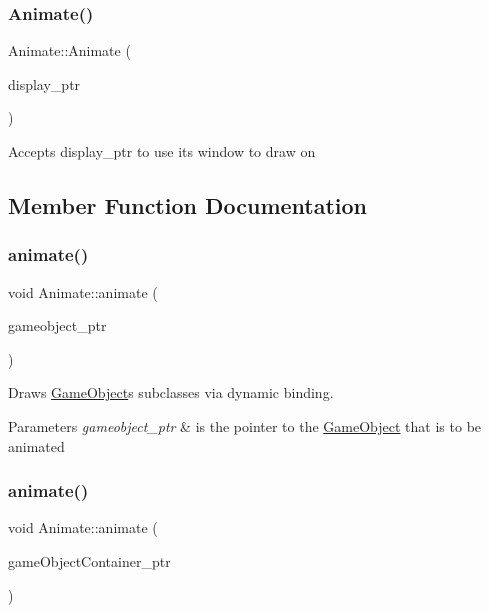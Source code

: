\subsubsection{\texorpdfstring{Animate()}{Animate()}}
{\footnotesize\ttfamily Animate\+::\+Animate (\begin{DoxyParamCaption}\item[{shared\+\_\+ptr$<$ \mbox{\hyperlink{class_display}{Display}} $>$}]{display\+\_\+ptr }\end{DoxyParamCaption})}

Accepts display\+\_\+ptr to use its window to draw on 

\subsection{Member Function Documentation}
\mbox{\label{class_animate_af57977742bd75111683827481af7ea2b}} 
\subsubsection{\texorpdfstring{animate()}{animate()}\hspace{0.1cm}{\footnotesize\ttfamily [1/2]}}
{\footnotesize\ttfamily void Animate\+::animate (\begin{DoxyParamCaption}\item[{shared\+\_\+ptr$<$ \mbox{\hyperlink{class_game_object}{Game\+Object}} $>$}]{gameobject\+\_\+ptr }\end{DoxyParamCaption})}



Draws \mbox{\hyperlink{class_game_object}{Game\+Object}}\textquotesingle{}s subclasses via dynamic binding. 


\begin{DoxyParams}{Parameters}
{\em gameobject\+\_\+ptr} & is the pointer to the \mbox{\hyperlink{class_game_object}{Game\+Object}} that is to be animated \\
\hline
\end{DoxyParams}
\mbox{\label{class_animate_a0f4c6efcc45e4705691f99642a3232c1}} 
\subsubsection{\texorpdfstring{animate()}{animate()}\hspace{0.1cm}{\footnotesize\ttfamily [2/2]}}
{\footnotesize\ttfamily void Animate\+::animate (\begin{DoxyParamCaption}\item[{shared\+\_\+ptr$<$ \mbox{\hyperlink{class_game_object_container}{Game\+Object\+Container}} $>$}]{game\+Object\+Container\+\_\+ptr }\end{DoxyParamCaption})}




